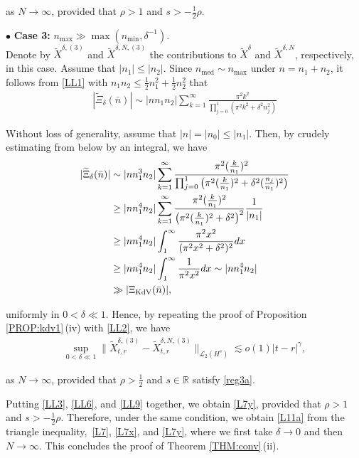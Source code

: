 \documentclass[letterpaper, 11pt,  reqno]{amsart}
\DeclareMathOperator{\med}{med}
\newcommand{\1}{\hspace{0.5mm}\text{I}\hspace{0.5mm}}
\newcommand{\noi}{\noindent}
\newcommand{\R}{\mathbb{R}}
\newcommand{\bul}{\bullet}
\newcommand{\dl}{\delta}
\newcommand{\g}{\gamma}
\newcommand{\wt}{\widetilde}
\newcommand{\les}{\lesssim}
\newcommand{\cL}{\mathcal{L}}
\newcommand{\KDV}{\text{\rm KdV} }
\numberwithin{equation}{section}
\numberwithin{theorem}{section}
\begin{document}
\noi
as $N \to \infty$, 
provided that 
 $\rho > 1$ and $s > -\frac 12\rho$.


\medskip

\noi
$\bul$ {\bf Case 3:} $n_{\max} \gg \max(  n_{\min},   \dl^{-1})$.\\
\indent
Denote by 
 $\wt X^{\dl, (3)}$ and $ \wt X^{\dl,N, (3)}$
the contributions to 
$\wt X^\dl$ and $\wt X^{\dl,N}$, respectively, in this case.
Assume that $|n_1|\le |n_2|$.
Since $n_{\med} \sim n_{\max}$ under $n = n_1 + n_2$, 
it follows from 
 \eqref{LL1} with $n_1 n_2 \le \frac 12 n_1^2 + \frac 12 n_2^2$ that 
\begin{align*}
|\wt \Xi_\dl(\bar n)|
\sim |n n_1 n_2|
 \sum_{k=1}^{\infty}   
 \frac{ \pi^2 k^2 }
 {\prod_{j = 0}^1(\pi^2k^2  +\dl^2n_j^2)}
\end{align*}

\noi
Without loss of generality, assume that $|n| = |n_0| \le |n_1|$.
Then,  
by crudely estimating from below by an integral, we have 
\begin{align*}
|\wt \Xi_\dl(\bar n)|
& \sim |n n_1^3 n_2|
 \sum_{k=1}^{\infty}   
 \frac{ \pi^2 (\frac{k}{n_1})^2 }
 {\prod_{j = 0}^1\big(\pi^2(\frac k{n_1})^2  +\dl^2(\frac{n_j}{n_1})^2\big)}\\
& \ge  |n n_1^4 n_2|
 \sum_{k=1}^{\infty}   
 \frac{ \pi^2 (\frac{k}{n_1})^2 }
 {\big(\pi^2(\frac k{n_1})^2  +\dl^2\big)^2}\frac{1}{|n_1|}\\
 & \ge  |n n_1^4 n_2|
\int_1^\infty
 \frac{ \pi^2 x^2}
 {(\pi^2x^2 +\dl^2)^2}dx\\
 & \ge  |n n_1^4 n_2|
\int_1^\infty
 \frac 1
 {\pi^2x^2}dx
\sim  |n n_1^4 n_2|\\
& \gg |\Xi_\KDV(\bar n)|, 
\end{align*}

\noi
uniformly in $0 < \dl \ll 1$.
Hence, by repeating the proof of Proposition 
\ref{PROP:kdv1}\,(iv) with \eqref{LL2}, we have 
\begin{align}
\sup_{0 < \dl \ll 1} \|  \wt X^{\dl, (3)}_{t,r} - \wt X^{\dl,N, (3)}_{t,r} \|_{\cL_2 (H^s)}
\les
 o(1) |t-r|^\g, 
\label{LL9}
\end{align}


\noi
as $N \to \infty$, 
provided that 
 $\rho > \frac 12$ and $s \in \R$
satisfy 
\eqref{reg3a}.


\medskip

Putting 
\eqref{LL3}, 
\eqref{LL6},  and 
\eqref{LL9} together, 
we obtain \eqref{L7y}, 
provided that 
 $\rho > 1$ and $s > -\frac 12\rho$.
Therefore, under the same condition, 
we obtain
\eqref{L11a}
from the triangle inequality,~\eqref{L7}, \eqref{L7x}, and \eqref{L7y}, 
where we first take $\dl \to 0$ and then $N \to \infty$.
This  concludes the proof of Theorem \ref{THM:conv}\,(ii).
\end{document}
